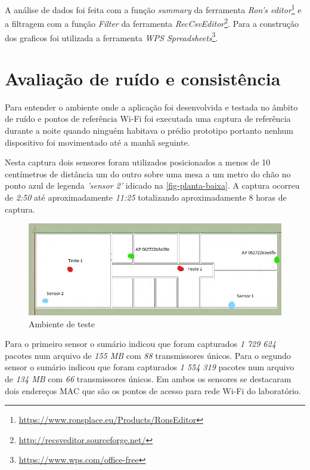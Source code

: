 A análise de dados foi feita com a função \emph{summary} da ferramenta
\emph{Ron’s editor}\footnote{\url{https://www.ronsplace.eu/Products/RonsEditor}}
e a filtragem com a função \emph{Filter} da ferramenta
\emph{RecCsvEditor}\footnote{\url{http://recsveditor.sourceforge.net/}}. Para a
construção dos graficos foi utilizada a ferramenta
\emph{WPS Spreadsheets}\footnote{\url{https://www.wps.com/office-free}}.

\clearpage
\section{Avaliação de ruído e consistência}
\label{sec:teste-ruido}


Para entender o ambiente onde a aplicação foi desenvolvida e testada no âmbito
de ruído e pontos de referência Wi-Fi foi executada uma captura de referência
durante a noite quando ninguém habitava o prédio prototipo portanto nenhum
dispositivo foi movimentado até a manhã seguinte.

Nesta captura dois sensores foram utilizados posicionados a menos de 10
centímetros de distância um do outro sobre uma mesa a um metro do chão no ponto
azul de legenda \emph{'sensor 2'} idicado na \autoref{fig-planta-baixa}. A captura
ocorreu de \emph{2:50} até aproximadamente \emph{11:25} totalizando aproximadamente 8 horas de
captura.

\begin{figure}[htb]
	\caption{\label{fig-planta-baixa}Ambiente de teste}
	\begin{center}
		\includegraphics[width=1\textwidth]{060-testes/data-analisis/planta-baixa_Ink_LI.jpg}
	\end{center}
\end{figure}


Para o primeiro sensor o sumário indicou que foram capturados \emph{1 729 624}
pacotes num arquivo de \emph{155 MB} com \emph{88} transmissores únicos.
Para o segundo sensor o sumário indicou que foram capturados \emph{1 554 319}
pacotes num arquivo de \emph{134 MB} com \emph{66} transmissores únicos.
Em ambos os sensores se destacaram dois endereços MAC que são os pontos de
acesso para rede Wi-Fi do laboratório.

